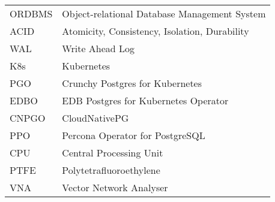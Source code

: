 
\seznamzkr

\begin{tabular}{ll}
    ORDBMS & Object-relational Database Management System  \\
    ACID   & Atomicity, Consistency, Isolation, Durability \\
    WAL    & Write Ahead Log                               \\
    K8s    & Kubernetes                                    \\
    PGO    & Crunchy Postgres for Kubernetes               \\
    EDBO   & EDB Postgres for Kubernetes Operator          \\
    CNPGO  & CloudNativePG                                 \\
    PPO    & Percona Operator for PostgreSQL               \\
    CPU    & Central Processing Unit                       \\
    PTFE   & Polytetrafluoroethylene                       \\
    VNA    & Vector Network Analyser                       \\
\end{tabular}

